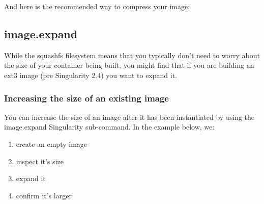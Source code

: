\documentclass[letterpaper,10pt,english]{sphinxmanual}
\begin{document}
And here is the recommended way to compress your image:

%
\begin{sphinxVerbatim}[commandchars=\\\{\}]
       
\end{sphinxVerbatim}


\subsection{image.expand}
\label{\detokenize{appendix:id42}}\label{\detokenize{appendix:sec-imageexpand}}
While the squashfs filesystem means that you typically don’t need to
worry about the size of your container being built, you might find that
if you are building an ext3 image (pre Singularity 2.4) you want to
expand it.


\subsubsection{Increasing the size of an existing image}
\label{\detokenize{appendix:increasing-the-size-of-an-existing-image}}
You can increase the size of an image after it has been instantiated
by using the image.expand Singularity sub-command. In the example
below, we:
\begin{enumerate}
\item {} 
create an empty image

\item {} 
inspect it’s size

\item {} 
expand it

\item {} 
confirm it’s larger

\end{enumerate}
\end{document}
